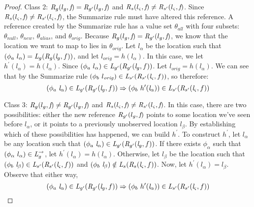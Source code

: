 \begin{proof}
Class 2: $\emph{R}_{g} ( l_{g},  \emph{f}) = \emph{R}_{g^\prime} ( l_{g},  \emph{f})$ and $\emph{R}_{s} ( l_{\varsigma},  \emph{f}) \neq \emph{R}_{s^\prime} ( l_{\varsigma},  \emph{f})$. Since $\emph{R}_{s} ( l_{\varsigma},  \emph{f}) \neq \emph{R}_{s^\prime} ( l_{\varsigma},  \emph{f})$, the Summarize rule must have altered this reference. A reference created by the Summarize rule has a value set $\theta_{all}$ with four subsets: $\theta_{null}$, $\theta_{new}$, $\theta_{alias}$, and $\theta_\mathit{orig}$. Because $\emph{R}_{g} ( l_{g},  \emph{f}) = \emph{R}_{g^\prime} ( l_{g},  \emph{f})$, we know that the location we want to map to lies in $\theta_\mathit{orig}$. Let $l_\alpha$ be the location such that ${(\phi_a\ l_\alpha)} = \cfgnt{L}_{\gse}(\cfgnt{R}_{\gse} (\cfgnt{l}_\gse,f )) $, and let $l_{orig} = h(l_\alpha)$. In this case, we let $h^\prime(l_\alpha) = h(l_\alpha)$. Since $(\phi_a\ l_\alpha) \in \emph{L}_{g^\prime}(\emph{R}_{g^\prime} (\emph{l}_{g},f ))$. Let $l_{orig} = h(l_\alpha)$. We can see that by the Summarize rule $ (\phi_b\ l_\mathit{orig})\in \emph{L}_{s^\prime}(\emph{R}_{s^\prime} (\emph{l}_{\varsigma},f ))$, so therefore:
$$(\phi_a\ \cfgnt{l}_\alpha) \in \cfgnt{L}_{\gse^\prime}(\cfgnt{R}_{\gse^\prime} (\cfgnt{l}_\gse,f )) \Rightarrow (\phi_b\ h^\prime (\cfgnt{l}_\alpha))\in \cfgnt{L}_{s^\prime}(\cfgnt{R}_{s^\prime} (\cfgnt{l}_\sym,f ))$$

Class 3: $\emph{R}_{g} ( l_{g},  \emph{f}) \neq \emph{R}_{g^\prime} ( l_{g},  \emph{f})$ and $\emph{R}_{s} ( l_{\varsigma},  \emph{f}) \neq \emph{R}_{s^\prime} ( l_{\varsigma},  \emph{f})$. In this case, there are two possibilities: either the new reference $\emph{R}_{g^\prime} ( l_{g},  \emph{f})$ points to some location we've seen before $l_\alpha$, or it points to a previously unobserved location $l_\beta$. By establishing which of these possibilities has happened, we can build $h^\prime$. To construct $h^\prime$, let $l_\alpha$ be any location such that $(\phi_a\ \cfgnt{l}_\alpha) \in \cfgnt{L}_{\gse^\prime}(\cfgnt{R}_{\gse^\prime} (\cfgnt{l}_\gse,f )) $. If there exists $\phi_\alpha$ such that $( \phi_\alpha\ l_\alpha ) \in \emph{L}_{g}^\rightarrow $, let $h^\prime(l_\alpha) = h(l_\alpha)$. Otherwise, let $l_\beta$ be the location such that $(\phi_b\ \cfgnt{l}_\beta) \in \cfgnt{L}_{s^\prime}(\cfgnt{R}_{s^\prime} (\cfgnt{l}_\sym,f )) $ and $(\phi_b\ \cfgnt{l}_\beta) \notin \cfgnt{L}_{s}(\cfgnt{R}_{s} (\cfgnt{l}_\sym,f )) $. Now, let $h^\prime(l_\alpha) = l_\beta$. Observe that either way,
$$(\phi_a\ \cfgnt{l}_\alpha) \in \cfgnt{L}_{\gse^\prime}(\cfgnt{R}_{\gse^\prime} (\cfgnt{l}_\gse,f )) \Rightarrow (\phi_b\ h^\prime (\cfgnt{l}_\alpha))\in \cfgnt{L}_{s^\prime}(\cfgnt{R}_{s^\prime} (\cfgnt{l}_\sym,f ))$$


\end{proof}
